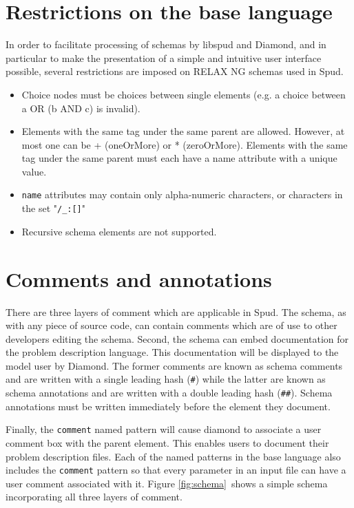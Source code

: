 \documentclass[a4paper, 11pt]{book}
\begin{document}
\section{Restrictions on the base language}

In order to facilitate processing of schemas by libspud and Diamond, and in
particular to make the presentation of a simple and intuitive user interface
possible, several restrictions are imposed on RELAX NG schemas used in Spud.

\begin{itemize}
\item Choice nodes must be choices between single elements (e.g. a choice
  between a OR (b AND c) is invalid).
\item Elements with the same tag under the same parent are allowed. However,
  at most one can be + (oneOrMore) or * (zeroOrMore). Elements with the same
  tag under the same parent must each have a name attribute with a unique
  value.
\item \lstinline+name+ attributes may contain only alpha-numeric characters,
  or characters in the set "\verb+/_:[]+"
\item Recursive schema elements are not supported.
\end{itemize}

\section{Comments and annotations}

There are three layers of comment which are applicable in Spud. The schema,
as with any piece of source code, can contain comments which are of use to
other developers editing the schema. Second, the schema can embed
documentation for the problem description language. This documentation will
be displayed to the model user by Diamond. The former comments are known as
schema comments and are written with a single leading hash (\verb+#+)
while the latter are known as schema annotations and are written with a
double leading hash (\verb+##+). Schema annotations must be written
immediately before the element they document.

Finally, the \verb+comment+ named pattern will cause diamond to associate a
user comment box with the parent element. This enables users to document
their problem description files. Each of the named patterns in the base
language also includes the \verb+comment+ pattern so that every parameter in
an input file can have a user comment associated with it. Figure
\ref{fig:schema}\ shows a simple schema incorporating all three layers of
comment.
\end{document}
